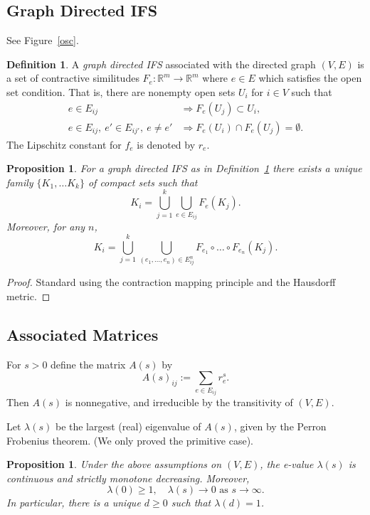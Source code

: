\documentclass[a4paper]{amsart}
\theoremstyle{plain}
\newtheorem{proposition}[theorem]{Proposition}
\theoremstyle{definition}
\newtheorem{definition}[theorem]{Definition}%
\theoremstyle{remark}
\begin{document}
 
\subsection{Graph Directed IFS}  See Figure~\ref{osc}.

\begin{definition} \label{gdifs}   A \emph{graph directed IFS} associated  with the directed graph $ (V,E) $ is a set of contractive similitudes $ F_e:\mathbb{R}^m \to \mathbb{R}^m $ where  $ e\in E $ which satisfies the open set condition.  That is, there are nonempty open sets $ U_i $ for $ i \in V $ such that 
\begin{align*}  
e \in E_{ij}  &\Longrightarrow F_e(U_j)\subset U_i, \\
e\in E_{ij}, \ e'\in E_{ij'},\  e \neq e' &\Longrightarrow F_e(U_i) \cap F_e(U_j) = \emptyset.
\end{align*} 
The Lipschitz constant for $ f_e $ is denoted by $ r_e $.
\end{definition}

\begin{proposition}\label{gdd}
 For a graph directed IFS as in Definition~\ref{gdifs} there exists a unique family $\{ K_1,\dots K_k\} $ of compact sets such that 
\[
K_i = \bigcup_{j=1}^k \bigcup_{e\in E_{ij}} F_e(K_j) .
\]
Moreover, for any $ n $,
\[
 K_i = \bigcup_{j=1}^k \bigcup_{(e_1,\dots, e_n) \in E^n_{ij}} F_{e_1}\circ \dots \circ F_{e_n}(K_j) .
 \]
 
 \end{proposition}
 
\begin{proof}  Standard using the contraction mapping principle and the Hausdorff metric. \end{proof} 
 
\subsection{Associated Matrices}  For $ s > 0 $ define the matrix $ A(s)$ by
\[   A(s)_{ij} := \sum_{e\in E_{ij}} r_e^s . \] 
Then $ A(s) $ is nonnegative, and irreducible by the transitivity of $ (V,E) $.

Let  $ \lambda (s) $ 
be the largest (real) eigenvalue of $ A(s)$, given by the Perron Frobenius theorem. (We only proved the primitive case).

\begin{proposition} \label{ev1} Under the above assumptions on $ (V,E) $, the e-value $  \lambda(s) $ is continuous  and strictly monotone decreasing.  Moreover,
\[
\lambda(0)\geq 1,  \quad \lambda(s)\to 0 \text{ as } s \to \infty .
\]
In particular, there is a unique $ d\geq 0 $ such that $ \lambda(d) = 1 $.
\end{proposition} 
\end{document}
